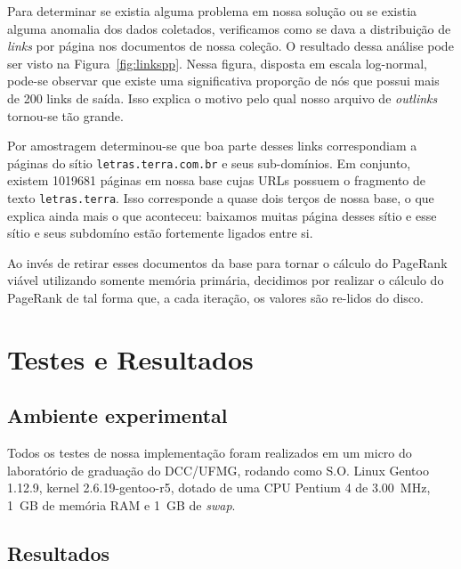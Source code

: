 \documentclass[10pt,twocolumn]{article}
\begin{document}
Para determinar se existia alguma problema em nossa solução ou se
existia alguma anomalia dos dados coletados, verificamos como se dava a
distribuição de \emph{links} por página nos documentos de nossa coleção.
O resultado dessa análise pode ser visto na Figura~\ref{fig:linkspp}.
Nessa figura, disposta em escala log-normal, pode-se observar que existe
uma significativa proporção de nós que possui mais de 200 links de
saída. Isso explica o motivo pelo qual nosso arquivo de \emph{outlinks}
tornou-se tão grande.

Por amostragem determinou-se que boa parte desses links correspondiam a
páginas do sítio \texttt{letras.terra.com.br} e seus sub-domínios. Em
conjunto, existem 1019681 páginas em nossa base cujas URLs possuem o
fragmento de texto \texttt{letras.terra}. Isso corresponde a quase dois
terços de nossa base, o que explica ainda mais o que aconteceu: baixamos
muitas página desses sítio e esse sítio e seus subdomíno estão
fortemente ligados entre si.

Ao invés de retirar esses documentos da base para tornar o cálculo do
PageRank viável utilizando somente memória primária, decidimos por
realizar o cálculo do PageRank de tal forma que, a cada iteração, os
valores são re-lidos do disco.


\section{Testes e Resultados}

\subsection{Ambiente experimental}

Todos os testes de nossa implementação foram realizados em um micro do
laboratório de graduação do DCC/UFMG, rodando como S.O. Linux Gentoo
1.12.9, kernel 2.6.19-gentoo-r5, dotado de uma CPU Pentium 4 de
3.00~MHz, 1~GB de memória RAM e 1~GB de \emph{swap}.

\subsection{Resultados}
\end{document}
